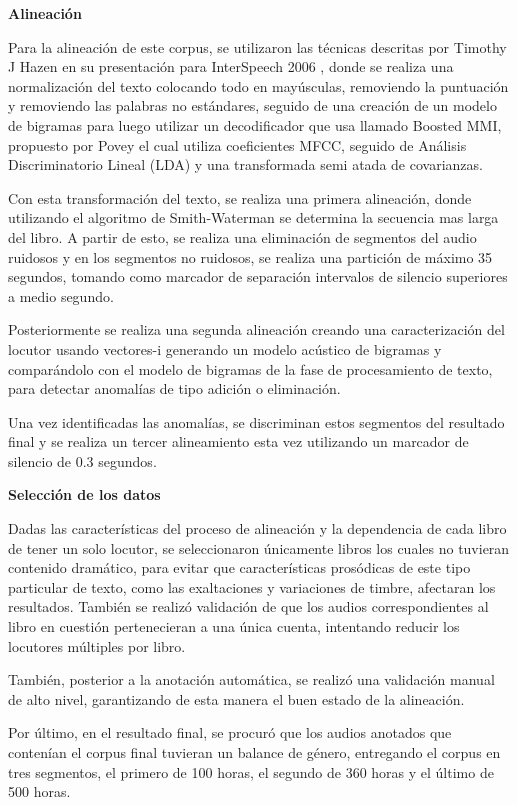 \textbf{Alineación}

Para la alineación de este corpus, se utilizaron las técnicas descritas por Timothy J Hazen en su presentación para InterSpeech 2006 \cite{HazenAutomatic}, donde se realiza una normalización del texto colocando todo en mayúsculas, removiendo la puntuación y removiendo las palabras no estándares, seguido de una creación de un modelo de bigramas para luego utilizar un decodificador que usa llamado Boosted MMI, propuesto por Povey \cite{PoveyBOOSTEDTRAINING} el cual utiliza coeficientes MFCC, seguido de Análisis Discriminatorio Lineal (LDA) y una transformada semi atada de covarianzas.

Con esta transformación del texto, se realiza una primera alineación, donde utilizando el algoritmo de Smith-Waterman \cite{Smite1981IdentificationSubsequences} se determina la secuencia mas larga del libro. A partir de esto, se realiza una eliminación de segmentos del audio ruidosos y en los segmentos no ruidosos, se realiza una partición de máximo 35 segundos, tomando como marcador de separación intervalos de silencio superiores a medio segundo.

Posteriormente se realiza una segunda alineación creando una caracterización del locutor usando vectores-i \cite{Dehak2011} generando un modelo acústico de bigramas y comparándolo con el modelo de bigramas de la fase de procesamiento de texto, para detectar anomalías de tipo adición o eliminación.

Una vez identificadas las anomalías, se discriminan estos segmentos del resultado final y se realiza un tercer alineamiento esta vez utilizando un marcador de silencio de 0.3 segundos.

\textbf{Selección de los datos}

Dadas las características del proceso de alineación y la dependencia de cada libro de tener un solo locutor, se seleccionaron únicamente libros los cuales no tuvieran contenido dramático, para evitar que características prosódicas de este tipo particular de texto, como las exaltaciones y variaciones de timbre, afectaran los resultados. También se realizó validación de que los audios correspondientes al libro en cuestión pertenecieran a una única cuenta, intentando reducir los locutores múltiples por libro.

También, posterior a la anotación automática, se realizó una validación manual de alto nivel, garantizando de esta manera el buen estado de la alineación.

Por último, en el resultado final, se procuró que los audios anotados que contenían el corpus final tuvieran un balance de género, entregando el corpus en tres segmentos, el primero de 100 horas, el segundo de 360 horas y el último de 500 horas.


